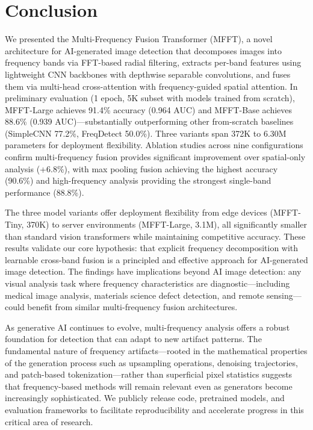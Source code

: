 \documentclass[journal]{IEEEtran}
\begin{document}
\section{Conclusion}
We presented the Multi-Frequency Fusion Transformer (MFFT), a novel architecture for AI-generated image detection that decomposes images into frequency bands via FFT-based radial filtering, extracts per-band features using lightweight CNN backbones with depthwise separable convolutions, and fuses them via multi-head cross-attention with frequency-guided spatial attention. In preliminary evaluation (1 epoch, 5K subset with models trained from scratch), MFFT-Large achieves 91.4\% accuracy (0.964 AUC) and MFFT-Base achieves 88.6\% (0.939 AUC)---substantially outperforming other from-scratch baselines (SimpleCNN 77.2\%, FreqDetect 50.0\%). Three variants span 372K to 6.30M parameters for deployment flexibility. Ablation studies across nine configurations confirm multi-frequency fusion provides significant improvement over spatial-only analysis (+6.8\%), with max pooling fusion achieving the highest accuracy (90.6\%) and high-frequency analysis providing the strongest single-band performance (88.8\%).

The three model variants offer deployment flexibility from edge devices (MFFT-Tiny, 370K) to server environments (MFFT-Large, 3.1M), all significantly smaller than standard vision transformers while maintaining competitive accuracy. These results validate our core hypothesis: that explicit frequency decomposition with learnable cross-band fusion is a principled and effective approach for AI-generated image detection. The findings have implications beyond AI image detection: any visual analysis task where frequency characteristics are diagnostic---including medical image analysis, materials science defect detection, and remote sensing---could benefit from similar multi-frequency fusion architectures.

As generative AI continues to evolve, multi-frequency analysis offers a robust foundation for detection that can adapt to new artifact patterns. The fundamental nature of frequency artifacts---rooted in the mathematical properties of the generation process such as upsampling operations, denoising trajectories, and patch-based tokenization---rather than superficial pixel statistics suggests that frequency-based methods will remain relevant even as generators become increasingly sophisticated. We publicly release code, pretrained models, and evaluation frameworks to facilitate reproducibility and accelerate progress in this critical area of research.
\end{document}
